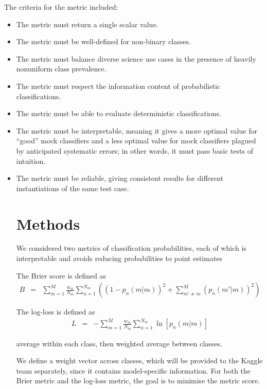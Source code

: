 \documentclass[\docopts]{\docclass}
\begin{document}
The criteria for the metric included:
\begin{itemize}
\item The metric must return a single scalar value.
\item The metric must be well-defined for non-binary classes.
\item The metric must balance diverse science use cases in the presence of heavily nonuniform class prevalence.
\item The metric must respect the information content of probabilistic classifications.
\item The metric must be able to evaluate deterministic classifications.
\item The metric must be interpretable, meaning it gives a more optimal value for ``good'' mock classifiers and a less optimal value for mock classifiers plagued by anticipated systematic errors; in other words, it must pass basic tests of intuition.
\item The metric must be reliable, giving consistent results for different instantiations of the same test case.

\section{Methods}
\label{sec:methods}
We considered two metrics of classification probabilities, each of which is interpretable and avoids reducing probabilities to point estimates

The Brier score is defined as
\begin{eqnarray*}
B &=& \sum_{m=1}^{M}\frac{w_{m}}{N_{m}}\sum_{n=1}^{N_{m}}\left((1-p_{n}(m | m))^{2}+\sum_{m'\neq m}^{M}(p_{n}(m' | m))^{2}\right)
\end{eqnarray*}

The log-loss is defined as
\begin{eqnarray*}
L &=& -\sum_{m=1}^{M}\frac{w_{m}}{N_{m}}\sum_{n=1}^{N_{m}}\ln[p_{n}(m | m)]
\end{eqnarray*}

average within each class, then weighted average between classes.

We define a weight vector across classes, which will be provided to the Kaggle team separately, since it contains model-specific information. For both the Brier metric and the log-loss metric, the goal is to minimise the metric score.


\end{itemize}
\end{document}
